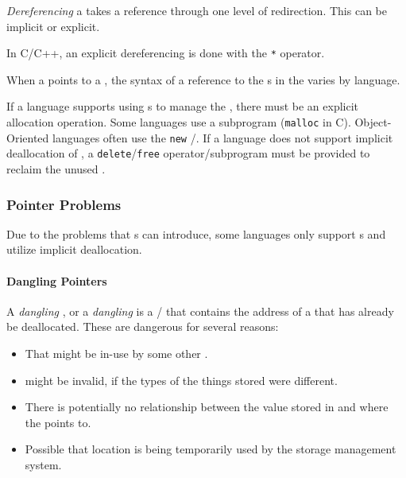 \begin{definition}[Dereferencing]\label{def:Pointer_Dereferencing}
  \emph{Dereferencing} a  takes a reference through one level of redirection.
  This can be implicit or explicit.

  In C/C++, an explicit dereferencing is done with the   \texttt{*} operator.

  \begin{remark}\label{rmk:Pointer_Dereference_Record}
    When a  points to a , the syntax of a reference to the s in the  varies by language.
  \end{remark}
\end{definition}

If a language supports using s to manage the , there must be an explicit allocation operation.
Some languages use a subprogram (\texttt{malloc} in C).
Object-Oriented languages often use the \texttt{new} /.
If a language does not support implicit deallocation of , a \texttt{delete}/\texttt{free} operator/subprogram must be provided to reclaim the unused .

\subsubsection{Pointer Problems}\label{subsubsec:Pointer-Problems}
Due to the problems that s can introduce, some languages only support s and utilize implicit deallocation.

\paragraph{Dangling Pointers}\label{par:Pointer-Dangling_Pointers}
\begin{definition}\label{def:Dangling_Pointer}
  A \emph{dangling }, or a \emph{dangling } is a / that contains the address of a  that has already be deallocated.
  These are dangerous for several reasons:
  \begin{itemize}[noitemsep]
  \item That  might be in-use by some other .
  \item {} might be invalid, if the types of the things stored were different.
  \item There is potentially no relationship between the value stored in  and where the  points to.
  \item Possible that location is being temporarily used by the storage management system.
  \end{itemize}
\end{definition}

